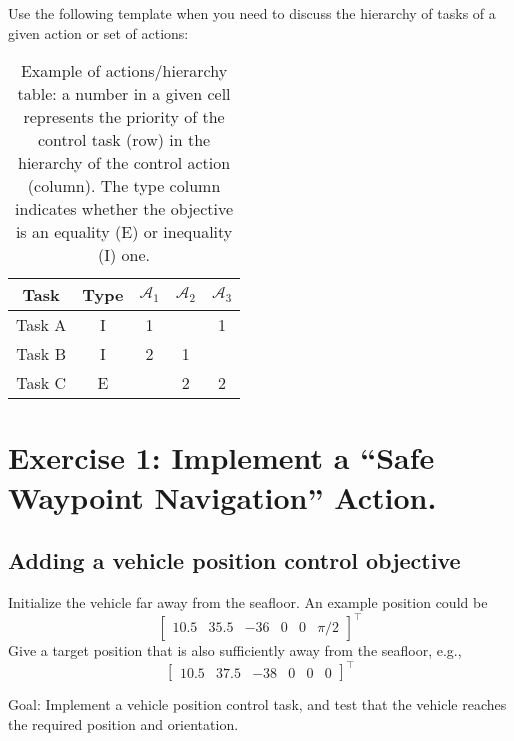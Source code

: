 \documentclass{article}
\begin{document}
Use the following template when you need to discuss the hierarchy of tasks of a given action or set of actions:
\begin{table}[htb]
	\caption{Example of actions/hierarchy table: a number in a given cell represents the priority of the control task (row) in the hierarchy of the control action (column). The type column indicates whether the objective is an equality (E) or inequality (I) one.}
	\label{tbl:actions_table}
	\begin{center}
		\footnotesize
		\begin{tabular}{ccccc}
			\toprule		
			Task & Type & $\mathcal{A}_{1}$ & $\mathcal{A}_{2}$ & $\mathcal{A}_{3} $	 \\
			\midrule
			Task A                    & I & 1 &   & 1  \\
			\hdashline
			Task B                & I & 2 & 1 &   \\
			\hdashline
			Task C                       & E &   & 2 & 2   \\
		
			\bottomrule
		\end{tabular}
	\end{center}
\end{table}%

\clearpage


\section{Exercise 1: Implement a “Safe Waypoint Navigation” Action.}

\subsection{Adding a vehicle position control objective}
Initialize the vehicle far away from the seafloor. An example position could be
\begin{displaymath}
\begin{bmatrix} 10.5 & 35.5 & -36 & 0 & 0 & \pi/2\end{bmatrix}^\top
\end{displaymath} 
Give a target position that is also sufficiently away from the seafloor, e.g.,
\begin{displaymath}
\begin{bmatrix} 10.5 & 37.5 & -38 & 0 & 0 & 0 \end{bmatrix}^\top
\end{displaymath}

Goal: Implement a vehicle position control task, and test that the vehicle reaches the required position and orientation.
\end{document}
